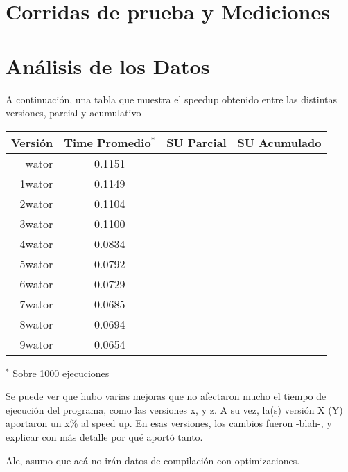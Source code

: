 \documentclass[a4paper,10pt]{article}
\begin{document}
\newpage

\section{Corridas de prueba y Mediciones}




\newpage

\section{An\'alisis de los Datos}

    A continuaci\'on, una tabla que muestra el speedup obtenido entre las distintas versiones, parcial y acumulativo


\begin{center}
  \begin{tabular}{| r | c | c | c |}
    \hline
    Versi\'on	&   Time Promedio$^*$  &	SU Parcial	& 	SU Acumulado	\\ \hline \hline
    wator	&	0.1151		&			&			\\ \hline
    1wator	&	0.1149		&			&			\\ \hline
    2wator	&	0.1104		&			&			\\ \hline
    3wator	&	0.1100		&			&			\\ \hline
    4wator	&	0.0834		&			&			\\ \hline
    5wator	&	0.0792		&			&			\\ \hline
    6wator	&	0.0729		&			&			\\ \hline
    7wator	&	0.0685		&			&			\\ \hline
    8wator	&	0.0694		&			&			\\ \hline
    9wator	&	0.0654		&			&			\\ \hline
    
  \end{tabular}
\end{center}
	
	\small{$^*$ Sobre 1000 ejecuciones}
	
\bigskip

    Se puede ver que hubo varias mejoras que no afectaron mucho el tiempo de ejecuci\'on del programa, como las versiones x, y z. A su vez, la(s) versi\'on X (Y) aportaron un x\% al speed up. En esas versiones, los cambios fueron -blah-, y explicar con m\'as detalle por qu\'e aport\'o tanto.

    
    
    
Ale, asumo que ac\'a no ir\'an datos de compilaci\'on con optimizaciones.
\end{document}
